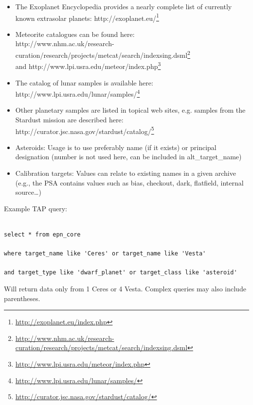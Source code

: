 \documentclass[11pt,a4paper]{ivoa}
\begin{document}
\begin{itemize}

\item The Exoplanet Encyclopedia provides a nearly complete list of currently known extrasolar planets: http://exoplanet.eu/\footnote{\url{http://exoplanet.eu/index.php}}

\item Meteorite catalogues can be found here: \\http://www.nhm.ac.uk/research-curation/research/projects/metcat/search/indexsing.dsml\footnote{\url{http://www.nhm.ac.uk/research-curation/research/projects/metcat/search/indexsing.dsml}} \\and http://www.lpi.usra.edu/meteor/index.php\footnote{\url{http://www.lpi.usra.edu/meteor/index.php}}

\item The catalog of lunar samples is available here: http://www.lpi.usra.edu/lunar/samples/\footnote{\url{http://www.lpi.usra.edu/lunar/samples/}}

\item Other planetary samples are listed in topical web sites, e.g. samples from the Stardust mission are described here: \\http://curator.jsc.nasa.gov/stardust/catalog/\footnote{\url{http://curator.jsc.nasa.gov/stardust/catalog/}}

\item Asteroids: Usage is to use preferably name (if it exists) or principal designation (number is not used here, can be included in alt\_target\_name)

\item Calibration targets: Values can relate to existing names in a given archive (e.g., the PSA contains values such as bias, checkout, dark, flatfield, internal source…)

\end{itemize}

Example TAP query:

\begin{verbatim}

select * from epn_core 

where target_name like 'Ceres' or target_name like 'Vesta' 

and target_type like 'dwarf_planet' or target_class like 'asteroid'

\end{verbatim}

Will return data only from 1 Ceres or 4 Vesta. Complex queries may also include parentheses.
\end{document}
